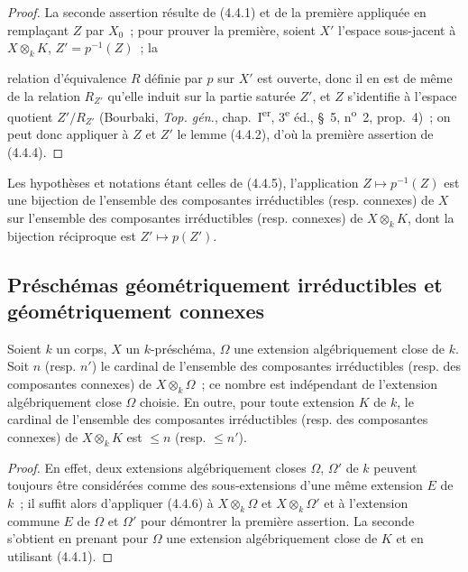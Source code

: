 \begin{proof}
La seconde assertion résulte de (4.4.1) et de la première appliquée en
remplaçant $Z$ par $X_0$~; pour prouver la première, soient $X'$ l'espace
sous-jacent à $X\otimes_k K$, $Z'=p^{-1}(Z)$~; la


relation d'équivalence $R$ définie par $p$ sur $X'$ est ouverte, donc il en est
de même de la relation $R_{Z'}$ qu'elle induit sur la partie saturée $Z'$, et
$Z$ s'identifie à l'espace quotient $Z'/R_{Z'}$ (Bourbaki,
\emph{Top. gén.}, chap.~I\textsuperscript{er}, 3\textsuperscript{e} éd.,
\S~5, n\textsuperscript{o}~2, prop.~4)~; on peut donc appliquer à $Z$ et $Z'$
le lemme (4.4.2), d'où la première assertion de (4.4.4).
\end{proof}

\begin{corollary}[4.4.6]
\label{IV.2.4.4.6-fr}
Les hypothèses et notations étant celles de (4.4.5), l'application
$Z\mapsto p^{-1}(Z)$ est une bijection de l'ensemble des composantes
irréductibles (resp. connexes) de $X$ sur l'ensemble des composantes
irréductibles (resp. connexes) de $X\otimes_k K$, dont la bijection réciproque
est $Z'\mapsto p(Z')$.
\end{corollary}

\subsection{Préschémas géométriquement irréductibles et géométriquement
connexes}
\label{subsection:IV.2.4.5-fr}

\begin{proposition}[4.5.1]
\label{IV.2.4.5.1-fr}
Soient $k$ un corps, $X$ un $k$-préschéma, $\Omega$ une extension
algébriquement close de $k$. Soit $n$ (resp. $n'$) le cardinal de l'ensemble
des composantes irréductibles (resp. des composantes connexes) de
$X\otimes_k\Omega$~; ce nombre est indépendant de l'extension algébriquement
close $\Omega$ choisie. En outre, pour toute extension $K$ de $k$, le cardinal
de l'ensemble des composantes irréductibles (resp. des composantes connexes)
de $X\otimes_k K$ est $\leqslant n$ (resp. $\leqslant n'$).
\end{proposition}

\begin{proof}
En effet, deux extensions algébriquement closes $\Omega$, $\Omega'$ de $k$
peuvent toujours être considérées comme des sous-extensions d'une même
extension $E$ de $k$~; il suffit alors d'appliquer (4.4.6) à
$X\otimes_k\Omega$ et $X\otimes_k\Omega'$ et à l'extension commune $E$ de
$\Omega$ et $\Omega'$ pour démontrer la première assertion. La seconde
s'obtient en prenant pour $\Omega$ une extension algébriquement close de $K$
et en utilisant (4.4.1).
\end{proof}

